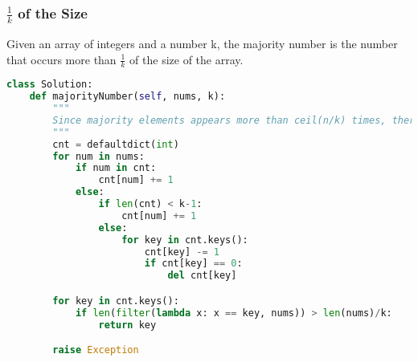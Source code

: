 \subsubsection{$\frac{1}{k}$ of the Size}
Given an array of integers and a number k, the majority number is the number that occurs more than $\frac{1}{k}$ of the size of
the array.
\begin{lstlisting}[language=python]
class Solution:
    def majorityNumber(self, nums, k):
        """
        Since majority elements appears more than ceil(n/k) times, there are at most 2 majority number
        """
        cnt = defaultdict(int)
        for num in nums:
            if num in cnt:
                cnt[num] += 1
            else:
                if len(cnt) < k-1:
                    cnt[num] += 1
                else:
                    for key in cnt.keys():
                        cnt[key] -= 1
                        if cnt[key] == 0:
                            del cnt[key]

        for key in cnt.keys():
            if len(filter(lambda x: x == key, nums)) > len(nums)/k:
                return key

        raise Exception
\end{lstlisting}


